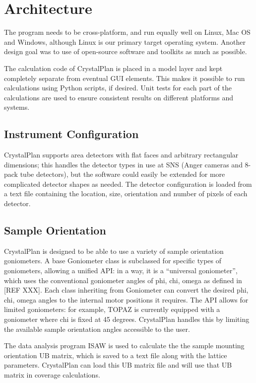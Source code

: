 \documentclass{iucr}              %
\begin{document}
\section{Architecture}

The program needs to be cross-platform, and run equally well on Linux, Mac OS
and Windows, although Linux is our primary target operating system. Another
design goal was to use of open-source software and toolkits as much as possible. 


The calculation code of CrystalPlan is placed in a model layer and kept
completely separate from eventual GUI elements. This makes it possible to run
calculations using Python scripts, if desired. Unit tests for each part of the
calculations are used to ensure consistent results on different platforms and
systems.    


\subsection{Instrument Configuration}

CrystalPlan supports area detectors with flat faces and arbitrary rectangular
dimensions; this handles the detector types in use at SNS (Anger cameras and
8-pack tube detectors), but the software could easily be extended for more
complicated detector shapes as needed. The detector configuration is loaded from
a text file containing the location, size, orientation and number of pixels of
each detector. 


\subsection{Sample Orientation}

CrystalPlan is designed to be able to use a variety of sample orientation
goniometers. A base Goniometer class is subclassed for specific types of
goniometers, allowing a unified API: in a way, it is a “universal goniometer”,
which uses the conventional goniometer angles of phi, chi, omega as defined in
[REF XXX]. Each class inheriting from Goniometer can convert the desired phi,
chi, omega angles to the internal motor positions it requires. The API allows
for limited goniometers: for example, TOPAZ is currently equipped with a
goniometer where chi is fixed at 45 degrees. CrystalPlan handles this by
limiting the available sample orientation angles accessible to the user.        
 
The data analysis program ISAW is used to calculate the the sample mounting
orientation UB matrix, which is saved to a text file along with the lattice
parameters. CrystalPlan can load this UB matrix file and will use that UB matrix
in coverage calculations.
\end{document}
